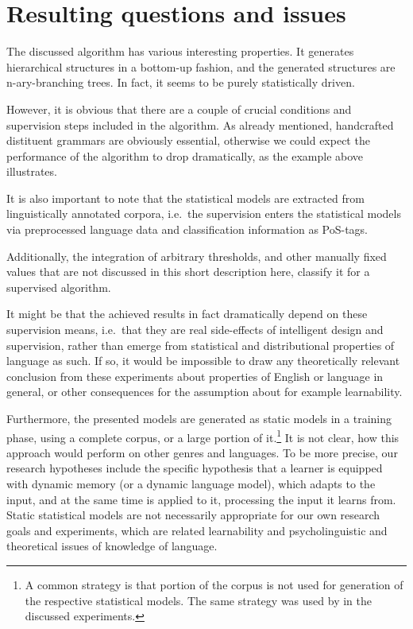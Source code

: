 \documentclass[11pt,a4paper,english]{article}
\begin{document}
\section{Resulting questions and issues}

The discussed algorithm has various interesting properties. It generates hierarchical structures in a bottom-up fashion, and the generated structures are n-ary-branching trees. In fact, it seems to be purely statistically driven.

However, it is obvious that there are a couple of crucial conditions and supervision steps included in the algorithm. As already mentioned, handcrafted distituent grammars are obviously essential, otherwise we could expect the performance of the algorithm to drop dramatically, as the example above illustrates.

It is also important to note that the statistical models are extracted from linguistically annotated corpora, i.e.\ the supervision enters the statistical models via preprocessed language data and classification information as PoS-tags.

Additionally, the integration of arbitrary thresholds, and other manually fixed values that are not discussed in this short description here, classify it for a supervised algorithm.

It might be that the achieved results in fact dramatically depend on these supervision means, i.e.\ that they are real side-effects of intelligent design and supervision, rather than emerge from statistical and distributional properties of language as such. If so, it would be impossible to draw any theoretically relevant conclusion from these experiments about properties of English or language in general, or other consequences for the assumption about for example learnability.

Furthermore, the presented models are generated as static models in a training phase, using a complete corpus, or a large portion of it.\footnote{A common strategy is that portion of the corpus is not used for generation of the respective statistical models. The same strategy was used by \cite{Magerman:Marcus:1990} in the discussed experiments.} It is not clear, how this approach would perform on other genres and languages. To be more precise, our research hypotheses include the specific hypothesis that a learner is equipped with dynamic memory (or a dynamic language model), which adapts to the input, and at the same time is applied to it, processing the input it learns from. Static statistical models are not necessarily appropriate for our own research goals and experiments, which are related  learnability and psycholinguistic and theoretical issues of knowledge of language.
\end{document}
